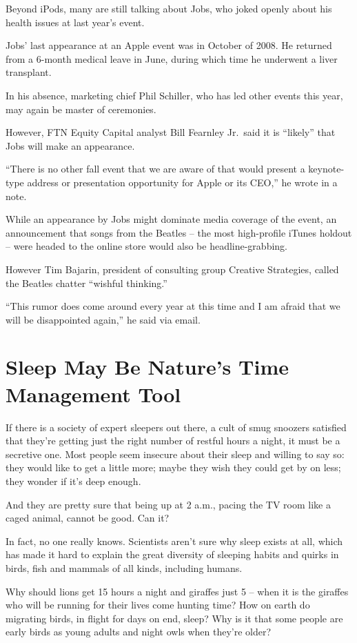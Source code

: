 ﻿\documentclass[12pt]{article}
\begin{document}
Beyond iPods, many are still talking about Jobs, who joked openly about his health issues at last
year's event.

Jobs' last appearance at an Apple event was in October of 2008. He returned from a 6-month medical
leave in June, during which time he underwent a liver transplant.

In his absence, marketing chief Phil Schiller, who has led other events this year, may again be
master of ceremonies.

However, FTN Equity Capital analyst Bill Fearnley Jr.~said it is ``likely'' that Jobs will make an
appearance.

``There is no other fall event that we are aware of that would present a keynote-type address or
presentation opportunity for Apple or its CEO,'' he wrote in a note.

While an appearance by Jobs might dominate media coverage of the event, an announcement that songs
from the Beatles -- the most high-profile iTunes holdout -- were headed to the online store would
also be headline-grabbing.

However Tim Bajarin, president of consulting group Creative Strategies, called the Beatles chatter
``wishful thinking.''

``This rumor does come around every year at this time and I am afraid that we will be disappointed
again,'' he said via email.

\section{Sleep May Be Nature's Time Management Tool}

If there is a society of expert sleepers out there, a cult\cite{cult} of smug\cite{smug} snoozers
satisfied that they're getting just the right number of restful hours a night, it must be a
secretive one. Most people seem insecure about their sleep and willing to say so: they would like to
get a little more; maybe they wish they could get by on less; they wonder if it's deep enough.

And they are pretty sure that being up at 2 a.m., pacing the TV room like a caged animal, cannot be
good. Can it?

In fact, no one really knows. Scientists aren't sure why sleep exists at all, which has made it hard
to explain the great diversity of sleeping habits and quirks in birds, fish and mammals of all
kinds, including humans.

Why should lions get 15 hours a night and giraffes\cite{giraffe} just 5 -- when it is the giraffes
who will be running for their lives come hunting time? How on earth do migrating birds, in flight
for days on end, sleep? Why is it that some people are early birds as young adults and night owls
when they're older?
\end{document}
